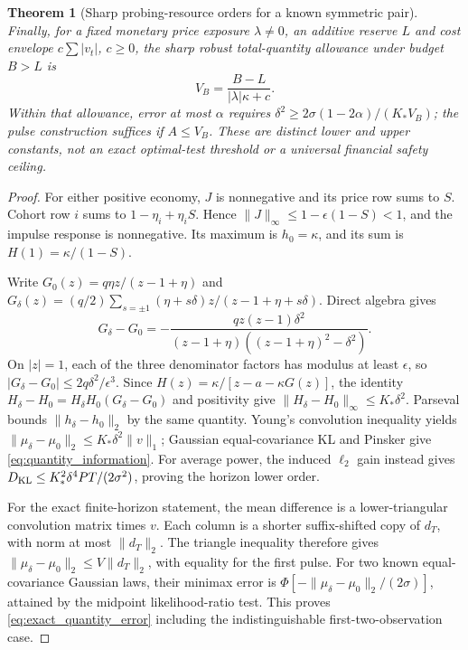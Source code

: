 \documentclass[11pt]{article}
\newtheorem{theorem}{Theorem}[section]\newtheorem{proposition}[theorem]{Proposition}\newtheorem{lemma}[theorem]{Lemma}
\begin{document}
\begin{theorem}[Sharp probing-resource orders for a known symmetric pair]
Finally, for a fixed monetary price exposure $\lambda\ne0$, an additive reserve $L$ and cost envelope $c\sum|v_t|$, $c\ge0$, the sharp robust total-quantity allowance under budget $B>L$ is
\begin{equation}
V_B=\frac{B-L}{|\lambda|\kappa+c}.
\label{eq:financial_resolution}
\end{equation}
Within that allowance, error at most $\alpha$ requires
$\delta^2\ge2\sigma(1-2\alpha)/(K_*V_B)$; the pulse construction suffices if $A\le V_B$. These are distinct lower and upper constants, not an exact optimal-test threshold or a universal financial safety ceiling.
\end{theorem}

\begin{proof}
For either positive economy, $J$ is nonnegative and its price row sums to $S$. Cohort row $i$ sums to $1-\eta_i+\eta_i S$. Hence $\|J\|_\infty\le1-\epsilon(1-S)<1$, and the impulse response is nonnegative. Its maximum is $h_0=\kappa$, and its sum is $H(1)=\kappa/(1-S)$.

Write $G_0(z)=q\eta z/(z-1+\eta)$ and
$G_\delta(z)=(q/2)\sum_{s=\pm1}(\eta+s\delta)z/(z-1+\eta+s\delta)$.
Direct algebra gives
\[
G_\delta-G_0
=-\frac{qz(z-1)\delta^2}{(z-1+\eta)((z-1+\eta)^2-\delta^2)}.
\]
On $|z|=1$, each of the three denominator factors has modulus at least $\epsilon$, so $|G_\delta-G_0|\le2q\delta^2/\epsilon^3$. Since $H(z)=\kappa/[z-a-\kappa G(z)]$, the identity $H_\delta-H_0=H_\delta H_0(G_\delta-G_0)$ and positivity give
$\|H_\delta-H_0\|_\infty\le K_*\delta^2$.
Parseval bounds $\|h_\delta-h_0\|_2$ by the same quantity. Young's convolution inequality yields $\|\mu_\delta-\mu_0\|_2\le K_*\delta^2\|v\|_1$; Gaussian equal-covariance KL and Pinsker give \eqref{eq:quantity_information}. For average power, the induced $\ell_2$ gain instead gives $D_{\rm KL}\le K_*^2\delta^4PT/(2\sigma^2)$, proving the horizon lower order.

For the exact finite-horizon statement, the mean difference is a lower-triangular convolution matrix times $v$. Each column is a shorter suffix-shifted copy of $d_T$, with norm at most $\|d_T\|_2$. The triangle inequality therefore gives $\|\mu_\delta-\mu_0\|_2\le V\|d_T\|_2$, with equality for the first pulse. For two known equal-covariance Gaussian laws, their minimax error is $\Phi[-\|\mu_\delta-\mu_0\|_2/(2\sigma)]$, attained by the midpoint likelihood-ratio test. This proves \eqref{eq:exact_quantity_error} including the indistinguishable first-two-observation case.


\end{proof}
\end{document}
